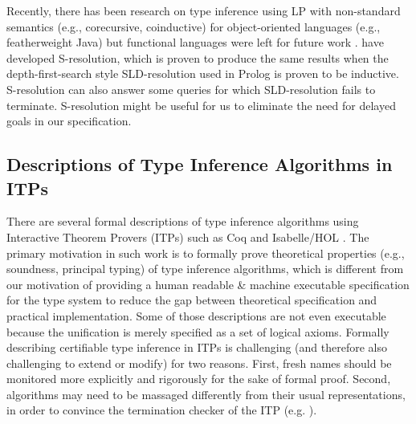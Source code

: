 Recently, there has been research on type inference using LP with non-standard
semantics (e.g., corecursive, coinductive) for object-oriented languages
(e.g., featherweight Java) but functional languages were left for
future work \cite{AL-ECOOP09}.
\citet{SRLP15} have developed S-resolution, which is proven \cite{PCR15} to
produce the same results when the depth-first-search style SLD-resolution
used in Prolog is proven to be inductive. S-resolution can also answer
some queries for which SLD-resolution fails to terminate.
S-resolution might be useful for us to eliminate the need for delayed goals
in our specification.

\subsection{Descriptions of Type Inference Algorithms in ITPs}
There are several formal descriptions of type inference algorithms using
Interactive Theorem Provers (ITPs) such as Coq \cite{Dubois00} and
Isabelle/HOL \cite{UrbanN2009}. The primary motivation %
in such work is to formally prove theoretical properties (e.g., soundness,
principal typing) of type inference algorithms, which is different from
our motivation of providing a human readable \& machine executable
specification for the type system to reduce the gap between
theoretical specification and practical implementation. Some of those
descriptions  are not even executable because the unification is merely
specified as a set of logical axioms.
Formally describing certifiable type inference in ITPs is challenging
(and therefore also challenging to extend or modify) for two reasons.
First, fresh names should be monitored more explicitly and rigorously for
the sake of formal proof. Second, algorithms may need to be massaged
differently from their usual representations, in order to convince
the termination checker of the ITP (e.g. \cite{JFP:185139}).

